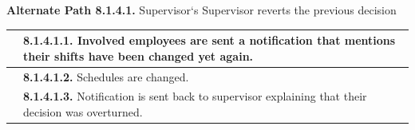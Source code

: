 \documentclass[letterpaper,12pt]{report}
\begin{document}
{\pagebreak

\centering \textbf{Alternate Path 8.1.4.1.}
\linebreak Supervisor`s Supervisor reverts the previous decision
\begin{center}
\xuchead
\begin{tabular}{| p{8.5cm} | p{8.5cm} |}
\hline
& \textbf{8.1.4.1.1.} Involved employees are sent a notification that mentions their shifts have been changed yet again. \\
\hline
& \textbf{8.1.4.1.2.} Schedules are changed. \\
\hline
& \textbf{8.1.4.1.3.} Notification is sent back to supervisor explaining that their decision was overturned. \\
\hline
\end{tabular}
\end{center}

}

\pagebreak
\end{document}
